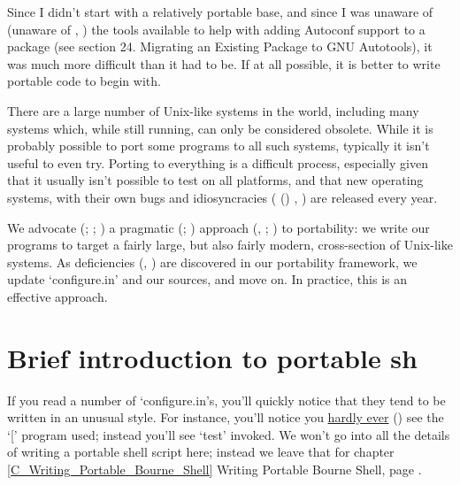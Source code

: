 Since I didn't start with a relatively portable base, and since I was
unaware of (unaware of {\MbQ{}}, {\MbQ{}}) the tools available to help with adding Autoconf support to a package (see section 24. Migrating an Existing Package to GNU Autotools), it was much more difficult than it had to be. If at all possible, it is better to write portable code to begin with. 


There are a large number of Unix-like systems in the world, including many 
systems which, while still running, can only be considered obsolete. While it 
is probably possible to port some programs to all such systems, typically it 
isn't useful to even try. Porting to everything is a difficult process,
especially given that it usually isn't possible to test on all platforms, and 
that new operating systems, with their own bugs and 
idiosyncracies ( ({\MaQ{}}) {\MbQ{}}, {\McQ{}}) are released every year. 


We advocate ({\MfQ{}}; {\MbQ{}}; {\MaQ{}}) a pragmatic ({\MaQ{}}; {\MaQ{}}) 
approach ({\MbQ{}}, {\McQ{}}; {\MfQ{}}) to portability: we write our programs to target a 
fairly large, but also fairly modern, cross-section of Unix-like systems. As 
deficiencies ({\MhQ{}}, {\MhQ{}}) are discovered in our portability framework, we 
update `configure.in' and our sources, and move on. In practice, this is an 
effective approach.



\section{Brief introduction to portable sh}


If you read a number of `configure.in's, you'll quickly notice that they tend 
to be written in an unusual style. For instance, you'll notice you 
\underline{hardly ever} ({\MbQ{}})\marginpar{ {\MaQ\cH202} sh script {\MaQ\cH85}\z{\MbQ\cH224} test {\MbQ\cH170}\z{\MaQ\cH85}\z{\MbQ\cH224} [
{\McQ\cH180}\z{\MjQ\cH228}\z{\MhQ\cH245}{\MaQ\cH1}}
see the `[' program used; instead you'll see `test' invoked. We won't go 
into all the details of writing a portable shell script here; instead we leave 
that for chapter \ref{C_Writing_Portable_Bourne_Shell} Writing Portable Bourne 
Shell, page \pageref{C_Writing_Portable_Bourne_Shell}. 


